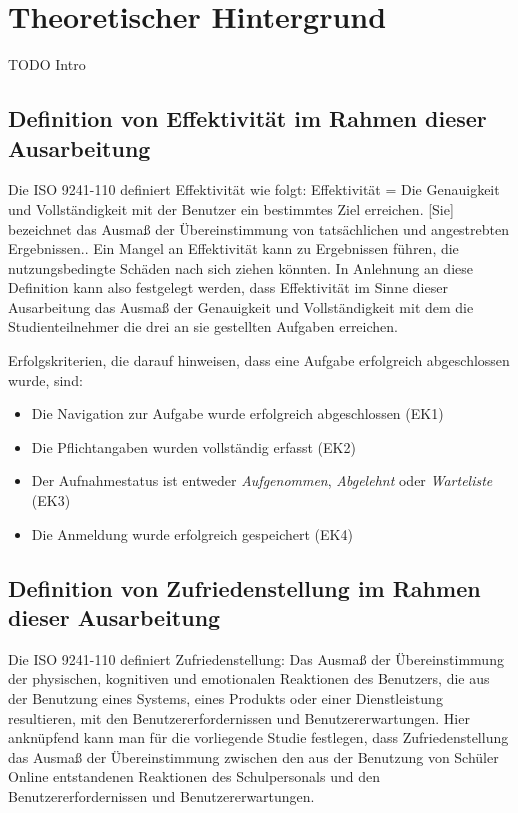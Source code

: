 \section{Theoretischer Hintergrund}
TODO Intro

\subsection{Definition von Effektivität im Rahmen dieser Ausarbeitung }
Die ISO 9241-110 definiert Effektivität wie folgt: \glqq Effektivität = Die Genauigkeit und Vollständigkeit mit der Benutzer ein bestimmtes Ziel erreichen\grqq{}\cite{ISO-9241-110}. 
\grqq{}[Sie] bezeichnet das Ausmaß der Übereinstimmung von tatsächlichen und angestrebten Ergebnissen.\grqq{}\cite{ISO-9241-110}. Ein \glqq Mangel an Effektivität kann zu Ergebnissen führen, die nutzungsbedingte Schäden nach sich ziehen könnten.\grqq{}\cite{ISO-9241-110}
In Anlehnung an diese Definition kann also festgelegt werden, dass Effektivität im Sinne dieser Ausarbeitung das Ausmaß der Genauigkeit und Vollständigkeit mit dem die Studienteilnehmer die drei an sie gestellten Aufgaben erreichen. 

Erfolgskriterien, die darauf hinweisen, dass eine Aufgabe erfolgreich abgeschlossen wurde, sind: 
\begin{itemize}
    \item Die Navigation zur Aufgabe wurde erfolgreich abgeschlossen (EK1)
    \item Die Pflichtangaben wurden vollständig erfasst (EK2)
    \item Der Aufnahmestatus ist entweder \textit{Aufgenommen}, \textit{Abgelehnt} oder \textit{Warteliste} (EK3)
    \item Die Anmeldung wurde erfolgreich gespeichert (EK4)
\end{itemize}

\subsection{Definition von Zufriedenstellung im Rahmen dieser Ausarbeitung}
Die ISO 9241-110 definiert Zufriedenstellung: \glqq Das Ausmaß der Übereinstimmung der physischen, kognitiven und emotionalen Reaktionen des Benutzers, die aus der Benutzung eines Systems, eines Produkts oder einer Dienstleistung resultieren, mit den Benutzererfordernissen und Benutzererwartungen.\grqq{}\cite{ISO-9241-110} Hier anknüpfend kann man für die vorliegende Studie festlegen, dass Zufriedenstellung das Ausmaß der Übereinstimmung zwischen den aus der Benutzung von Schüler Online entstandenen Reaktionen des Schulpersonals und den Benutzererfordernissen und Benutzererwartungen. 

